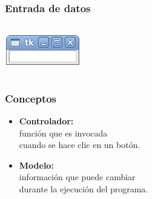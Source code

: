 \documentclass[12pt]{beamer}
\begin{document}
  \begin{frame}
    \frametitle{Entrada de datos}
    \begin{columns}[B]
        \footnotesize
        
        \vspace{20ex}
        \includegraphics[width=\textwidth]{programas/tkinter/capturas/entrada.png}
    \end{columns}
  \end{frame}

  \begin{frame}
    \frametitle{Conceptos}
    \begin{itemize}
      \Large
      \item \textbf{Controlador:} \\
        función que es invocada \\
        cuando se hace clic en un botón.
      \item \textbf{Modelo:} \\
        información que puede cambiar \\
        durante la ejecución del programa.
    \end{itemize}
  \end{frame}
\end{document}
